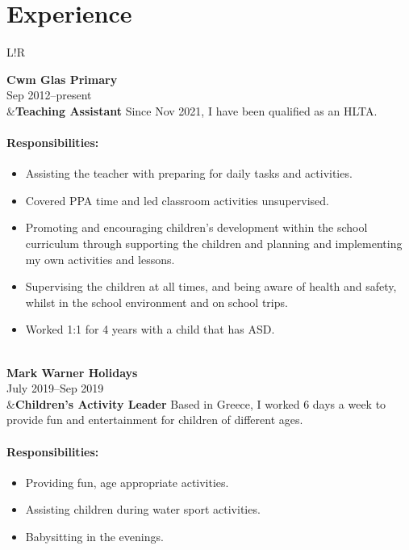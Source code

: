 \documentclass[10pt]{article}
\newcommand\VRule{\color{lightgray}\vrule width 0.5pt}
\begin{document}
\section*{Experience}
\begin{longtable}{L!{\VRule}R}

{\bf Cwm Glas Primary}\\
Sep 2012--present\\
&{\bf Teaching Assistant}\newline
Since Nov 2021, I have been qualified as an HLTA.

\vspace{-3mm}
\paragraph{Responsibilities:}
\begin{itemize}[noitemsep,topsep=0pt]
    \item Assisting the teacher with preparing for daily tasks and activities.
    \item Covered PPA time and led classroom activities unsupervised.
    \item Promoting and encouraging children's development within the school curriculum through supporting the children and planning and implementing my own activities and lessons.
    \item Supervising the children at all times, and being aware of health and safety, whilst in the school environment and on school trips.
    \item Worked 1:1 for 4 years with a child that has ASD.
\end{itemize}
\\

{\bf Mark Warner Holidays}\\
July 2019--Sep 2019\\
&{\bf Children's Activity Leader}\newline
Based in Greece, I worked 6 days a week to provide fun and entertainment for children of different ages.

\vspace{-3mm}
\paragraph{Responsibilities:}
\begin{itemize}[noitemsep,topsep=0pt]
    \item Providing fun, age appropriate activities.
    \item Assisting children during water sport activities.
    \item Babysitting in the evenings.
\end{itemize}
\\


\end{longtable}
\end{document}
